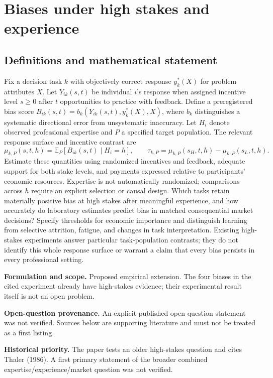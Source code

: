 \documentclass[11pt]{article}
\begin{document}
\section*{Biases under high stakes and experience}\label{30007584}
\subsection{Definitions and mathematical statement}
Fix a decision task \(k\) with objectively correct response \(y_k^*(X)\) for problem attributes \(X\). Let \(Y_{ik}(s,t)\) be individual \(i\)'s response when assigned incentive level \(s\geq0\) after \(t\) opportunities to practice with feedback. Define a preregistered bias score \(B_{ik}(s,t)=b_k(Y_{ik}(s,t),y_k^*(X),X)\), where \(b_k\) distinguishes a systematic directional error from unsystematic inaccuracy. Let \(H_i\) denote observed professional expertise and \(P\) a specified target population. The relevant response surface and incentive contrast are
\[\mu_{k,P}(s,t,h)=\mathbb E_P[B_{ik}(s,t)\mid H_i=h],\qquad \tau_{k,P}=\mu_{k,P}(s_H,t,h)-\mu_{k,P}(s_L,t,h).\]
Estimate these quantities using randomized incentives and feedback, adequate support for both stake levels, and payments expressed relative to participants' economic resources. Expertise is not automatically randomized; comparisons across \(h\) require an explicit selection or causal design. Which tasks retain materially positive bias at high stakes after meaningful experience, and how accurately do laboratory estimates predict bias in matched consequential market decisions? Specify thresholds for economic importance and distinguish learning from selective attrition, fatigue, and changes in task interpretation. Existing high-stakes experiments answer particular task-population contrasts; they do not identify this whole response surface or warrant a claim that every bias persists in every professional setting.

\par\textbf{Formulation and scope.} Proposed empirical extension. The four biases in the cited experiment already have high-stakes evidence; their experimental result itself is not an open problem.

\par\textbf{Open-question provenance.} An explicit published open-question statement was not verified. Sources below are supporting literature and must not be treated as a first listing.

\par\textbf{Historical priority.} The paper tests an older high-stakes question and cites Thaler (1986). A first primary statement of the broader combined expertise/experience/market question was not verified.
\end{document}
